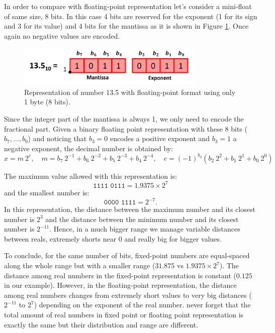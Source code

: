 In order to compare with floating-point representation
let's consider a mini-float of same size, 8 bits.
In this case 4 bits are reserved for the exponent (1 for its sign and 3 for its value) 
and 4 bits for the mantissa as it is shown in Figure \ref{fig:FloatFloat}. 
Once again no negative values are encoded.

\begin{figure}[h]
    \centering
    \includegraphics[width= 0.8\textwidth]{./doc/Figures/FloatFloat2.png}
    \caption{Representation of number 13.5 with floating-point format using only 1 byte (8 bits).}
    \label{fig:FloatFloat}
\end{figure}

Since the integer part of the mantissa is always 1, we only need to encode the fractional part.
Given a binary floating point representation with these 8 bits ($b_7, \ldots, b_0$) 
and noticing that $b_3 = 0$ encodes a positive exponent and $b_3 = 1$ a negative exponent, 
the decimal number is obtained by:
$$
   x = m \ 2^e, \quad m =  b_7 \ 2^{-1}  + b_6 \ 2^{-2} + b_5 \ 2^{-3} + b_4 \ 2^{-4}, \quad 
    e =  (-1)^{b_3} (  b_2 \ 2^{2} + b_1 \ 2^{1} + b_0 \ 2^{0} ) 
$$

The maximum value allowed with this representation is: 
$$
   \texttt{1111 0111} = 1.9375 \times 2^{7}
$$   
and the smallest number is: 
$$
   \texttt{0000 1111} =  2^{-7}.
$$ 
In this representation, the distance between the maximum number and its closest number is $2^3$
and the distance between the minimum number and its closest number is $ 2^{-11}$. Hence, in a 
much bigger range we manage variable distances between reals, extremely shorts near 0 and really big 
for bigger values. 





To conclude, for the same number of bits, fixed-point numbers are equal-spaced along 
the whole range but with a smaller range ($31.875$ vs $ 1.9375 \times 2^{7}$).
The distance among real numbers in the fixed-point representation is constant ($0.125$ in our example). 
However, in the floating-point representation, the distance among real numbers 
changes from extremely short values to very big distances ($2^{-11}$ to $ 2^{7}$) depending on the exponent of the real number. 
never forget that the total amount of real numbers in fixed point or floating point 
representation is exactly the same but their distribution and range are different.



